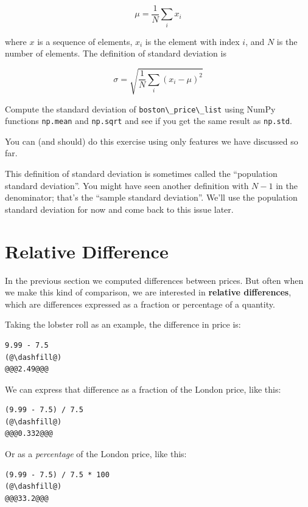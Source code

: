 \[ \mu = \frac{1}{N} \sum_i x_i \]

where \(x\) is a sequence of elements, \(x_i\) is the element with index
\(i\), and \(N\) is the number of elements. The definition of standard
deviation is

\[ \sigma = \sqrt{\frac{1}{N} \sum_i (x_i - \mu)^2} \]

Compute the standard deviation of
\passthrough{\lstinline!boston\_price\_list!} using NumPy functions
\passthrough{\lstinline!np.mean!} and \passthrough{\lstinline!np.sqrt!}
and see if you get the same result as \passthrough{\lstinline!np.std!}.

You can (and should) do this exercise using only features we have
discussed so far.

This definition of standard deviation is sometimes called the
``population standard deviation''. You might have seen another
definition with \(N-1\) in the denominator; that's the ``sample standard
deviation''. We'll use the population standard deviation for now and
come back to this issue later.

\hypertarget{relative-difference}{%
\section{Relative Difference}\label{relative-difference}}

In the previous section we computed differences between prices. But
often when we make this kind of comparison, we are interested in
\textbf{relative differences}, which are differences expressed as a
fraction or percentage of a quantity.

Taking the lobster roll as an example, the difference in price is:

\begin{lstlisting}[]
9.99 - 7.5
(@\dashfill@)
@@@2.49@@@
\end{lstlisting}

We can express that difference as a fraction of the London price, like
this:

\begin{lstlisting}[]
(9.99 - 7.5) / 7.5
(@\dashfill@)
@@@0.332@@@
\end{lstlisting}

Or as a \emph{percentage} of the London price, like this:

\begin{lstlisting}[]
(9.99 - 7.5) / 7.5 * 100
(@\dashfill@)
@@@33.2@@@
\end{lstlisting}

